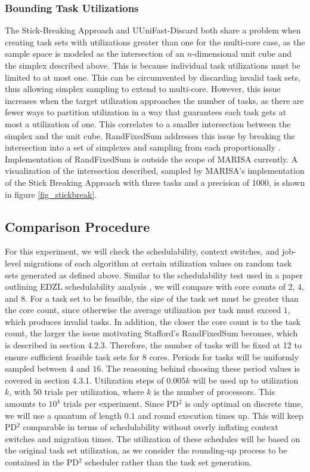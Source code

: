 \documentclass[conference,compsoc]{IEEEtran}
\begin{document}
\subsubsection{Bounding Task Utilizations} The Stick-Breaking Approach and UUniFast-Discard both share a problem when creating task sets with utilizations greater than one for the multi-core case, as the sample space is modeled as the intersection of an $n$-dimensional unit cube and the simplex described above. This is because individual task utilizations must be limited to at most one. This can be circumvented by discarding invalid task sets, thus allowing simplex sampling to extend to multi-core. However, this issue increases when the target utilization approaches the number of tasks, as there are fewer ways to partition utilization in a way that guarantees each task gets at most a utilization of one. This correlates to a smaller intersection between the simplex and the unit cube. RandFixedSum addresses this issue by breaking the intersection into a set of simplexes and sampling from each proportionally \cite{randfixedsum}. Implementation of RandFixedSum is outside the scope of MARISA currently. A visualization of the intersection described, sampled by MARISA's implementation of the Stick Breaking Approach with three tasks and a precision of 1000, is shown in figure \ref{fig_stickbreak}.

\subsection{Comparison Procedure}
For this experiment, we will check the schedulability, context switches, and job-level migrations of each algorithm at certain utilization values on random task sets generated as defined above. Similar to the schedulability test used in a paper outlining EDZL schedulability analysis \cite{edzl}, we will compare with core counts of 2, 4, and 8. For a task set to be feasible, the size of the task set must be greater than the core count, since otherwise the average utilization per task must exceed $1$, which produces invalid tasks. In addition, the closer the core count is to the task count, the larger the issue motivating Stafford's RandFixedSum becomes, which is described in section 4.2.3. Therefore, the number of tasks will be fixed at 12 to ensure sufficient feasible task sets for $8$ cores. Periods for tasks will be uniformly sampled between $4$ and $16$. The reasoning behind choosing these period values is covered in section 4.3.1. Utilization steps of $0.005k$ will be used up to utilization $k$, with $50$ trials per utilization, where $k$ is the number of processors. This amounts to $10^4$ trials per experiment. Since PD$^2$ is only optimal on discrete time, we will use a quantum of length $0.1$ and round execution times up. This will keep PD$^2$ comparable in terms of schedulability without overly inflating context switches and migration times. The utilization of these schedules will be based on the original task set utilization, as we consider the rounding-up process to be contained in the PD$^2$ scheduler rather than the task set generation.
\end{document}
